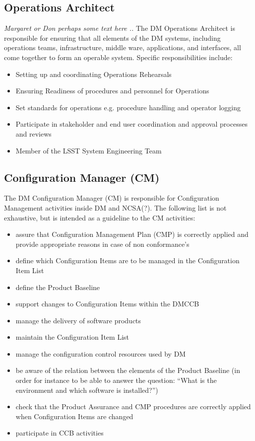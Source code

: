 \subsection{Operations Architect \label{role:opsarc}}
{\em Margaret  or Don perhaps some text here .. }
The DM Operations  Architect is responsible for ensuring that all elements of the DM systems, including operations teams, infrastructure, middle ware, applications, and interfaces, 
all come together to form an operable system. 
Specific responsibilities include:
\begin{itemize}
\item Setting up and coordinating  Operations Rehearsals
\item Ensuring Readiness of procedures and personnel for Operations
\item Set standards for operations e.g. procedure handling and operator logging
\item Participate in stakeholder and end user coordination and approval processes and reviews
\item Member of the LSST System Engineering Team
\end{itemize}


\subsection{Configuration Manager (CM)}\label{role:cm}

The DM Configuration Manager (CM) is responsible 
for Configuration Management activities inside DM and NCSA(?).
The following list is not exhaustive, but is intended as a guideline to the CM activities:
\begin{itemize}
	\item assure that Configuration Management Plan (CMP) is correctly applied and provide appropriate reasons in case of non conformance's 
 \item define which Configuration Items are to be managed in the Configuration Item List
 \item define the Product Baseline
 \item support changes to Configuration Items within the DMCCB
 \item manage the delivery of software products
 \item maintain the Configuration Item List
 \item manage the configuration control resources used by DM
 \item be aware of the relation between  the elements of the Product Baseline (in order for instance to be able to answer the question: ``What is the environment and which software is installed?'')
 \item check that the Product Assurance  and CMP procedures are correctly applied when Configuration Items are changed
 \item participate in CCB activities
\end{itemize}

